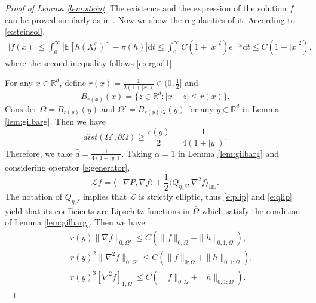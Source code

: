 \documentclass[12pt]{amsart}
\theoremstyle{definition}
\theoremstyle{remark}
\numberwithin{equation}{section}
\newcommand{\dif}{\mathrm{d}}
\newcommand{\E}{\mathbb{E}}            %
\newcommand{\Ll}{\langle}
\newcommand{\Rr}{\rangle}
\newcommand{\R}{\mathbb{R}}\newcommand{\RR}{\mathbb{R}}
\begin{document}
\begin{proof}[Proof of Lemma \ref{lem:stein}]
	The existence and the expression of the solution $f$ can be proved similarly as in \cite[Proposition 6.1]{FSX19}. Now we show the regularities of it. According to \eqref{e:steinsol},
	\begin{eqnarray*}
		|f(x)|\le \int_0^\infty |\E[h(X_t^x)]-\pi(h)|\dif t\le \int_0^\infty C(1+|x|^2)e^{-ct}\dif t\le C(1+|x|^2),
	\end{eqnarray*}	
	where the second inequality follows \eqref{e:ergod1}.
	
	For any $x\in\R^d$, define $r(x)=\frac{1}{2(1+|x|)}\in(0,\frac12]$ and 
	$$B_{r(x)}(x)=\{z\in\R^d: |x-z|\le r(x)\}.$$ 
	Consider $\Omega=B_{r(y)}(y)$ and  $\Omega'=B_{r(y)/2}(y)$ for any $y\in \R^d$ in Lemma \ref{lem:gilbarg}. Then we have $$dist(\Omega',\partial\Omega)\ge \frac{r(y)}{2}=\frac{1}{4(1+|y|)}.$$
Therefore, we take $\bar d=\frac{1}{4(1+|y|)}$.
	Taking $\alpha=1$ in Lemma \ref{lem:gilbarg} and considering operator \eqref{e:generator}, 
	\begin{equation*}
		\mathcal L f=\Ll -\nabla P, \nabla f \Rr+\frac1 2\Ll Q_{\eta,\delta},\nabla^2f \Rr_{\text{HS}}. 
	\end{equation*}
	The notation of $Q_{\eta,\delta}$  implies that $\mathcal{L}$ is strictly elliptic, thus \eqref{e:plip} and \eqref{e:qlip} yield that its coefficients are Lipschitz functions in $\bar\Omega$ which satisfy the condition of Lemma \ref{lem:gilbarg}. Then we have
	\begin{eqnarray}
		&&r(y) \| \nabla f \|_{0; \Omega'} \leq C ( \| f \|_{0; \Omega} + \|h \|_{0, 1; \Omega}),\label{e:regularity6}\\
		&&r(y)^2 \| \nabla^2 f \|_{0; \Omega'} \leq C ( \| f \|_{0; \Omega} + \|h \|_{0, 1; \Omega}),\label{e:regularity7}\\ 
		&&r(y)^3 [ \nabla^2 f ]_{1; \Omega'} \leq C ( \| f \|_{0; \Omega} + \|h \|_{0, 1; \Omega}).\label{e:regularity8}
	\end{eqnarray}
	

\end{proof}
\end{document}
